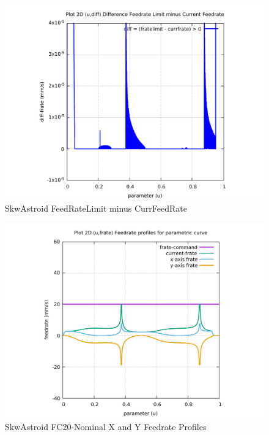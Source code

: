 \begin{figure}
	\caption     {SkwAstroid FeedRateLimit minus CurrFeedRate}
	\label{12-img-SkwAstroid-FeedRateLimit-minus-CurrFeedRate.pdf}
	\includegraphics[width=1.00\textwidth]{Chap4/appendix/app-SkwAstroid/plots/12-img-SkwAstroid-FeedRateLimit-minus-CurrFeedRate.pdf}
\end{figure}

\clearpage
\pagebreak

\begin{figure}
	\caption     {SkwAstroid FC20-Nominal X and Y Feedrate Profiles}
	\label{13-img-SkwAstroid-FC20-Nominal-X-and-Y-Feedrate-Profiles.pdf}
	\includegraphics[width=1.00\textwidth]{Chap4/appendix/app-SkwAstroid/plots/13-img-SkwAstroid-FC20-Nominal-X-and-Y-Feedrate-Profiles.pdf}
\end{figure}


